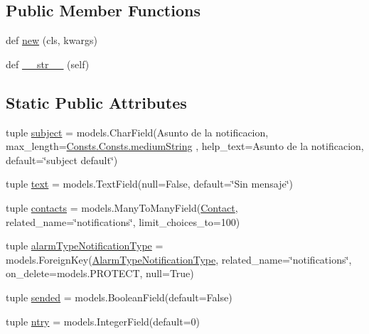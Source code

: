 \subsection*{Public Member Functions}
\begin{DoxyCompactItemize}
\item 
def \hyperlink{class_ground_segment_1_1models_1_1_notification_1_1_notification_1_1_notification_ad9be3de0a1aef79bd4828cf5f3db8973}{new} (cls, kwargs)
\item 
def \hyperlink{class_ground_segment_1_1models_1_1_notification_1_1_notification_1_1_notification_aa9325e10b792980bc5670b3c250c0234}{\+\_\+\+\_\+str\+\_\+\+\_\+} (self)
\end{DoxyCompactItemize}
\subsection*{Static Public Attributes}
\begin{DoxyCompactItemize}
\item 
tuple \hyperlink{class_ground_segment_1_1models_1_1_notification_1_1_notification_1_1_notification_a5d4145d0ba4943ac10e0a269ea3ae54e}{subject} = models.\+Char\+Field(\textquotesingle{}Asunto de la notificacion\textquotesingle{}, max\+\_\+length=\hyperlink{class_ground_segment_1_1models_1_1_consts_1_1_consts_af293fcd2dc1b82ccc52722f90ac343ca}{Consts.\+Consts.\+medium\+String} , help\+\_\+text=\textquotesingle{}Asunto de la notificacion\textquotesingle{}, default=\char`\"{}subject default\char`\"{})
\item 
tuple \hyperlink{class_ground_segment_1_1models_1_1_notification_1_1_notification_1_1_notification_aab87e972d1da9172d2e7cce622b8fce3}{text} = models.\+Text\+Field(null=False, default=\char`\"{}Sin mensaje\char`\"{})
\item 
tuple \hyperlink{class_ground_segment_1_1models_1_1_notification_1_1_notification_1_1_notification_a1c85d3bd1dfb69b866c0b0023dd8bc6f}{contacts} = models.\+Many\+To\+Many\+Field(\hyperlink{class_ground_segment_1_1models_1_1_notification_1_1_contact_1_1_contact}{Contact}, related\+\_\+name=\char`\"{}notifications\char`\"{}, limit\+\_\+choices\+\_\+to=100)
\item 
tuple \hyperlink{class_ground_segment_1_1models_1_1_notification_1_1_notification_1_1_notification_ad668e7d1e333d3c3d4114276108046d7}{alarm\+Type\+Notification\+Type} = models.\+Foreign\+Key(\hyperlink{class_ground_segment_1_1models_1_1_notification_1_1_alarm_type_notification_type_1_1_alarm_type_notification_type}{Alarm\+Type\+Notification\+Type}, related\+\_\+name=\char`\"{}notifications\char`\"{}, on\+\_\+delete=models.\+P\+R\+O\+T\+E\+C\+T, null=True)
\item 
tuple \hyperlink{class_ground_segment_1_1models_1_1_notification_1_1_notification_1_1_notification_aec220ade3819946a0fb450d03e5ef97c}{sended} = models.\+Boolean\+Field(default=False)
\item 
tuple \hyperlink{class_ground_segment_1_1models_1_1_notification_1_1_notification_1_1_notification_a12664635efcb42cc8aef3d64c43b24d9}{ntry} = models.\+Integer\+Field(default=0)
\end{DoxyCompactItemize}


